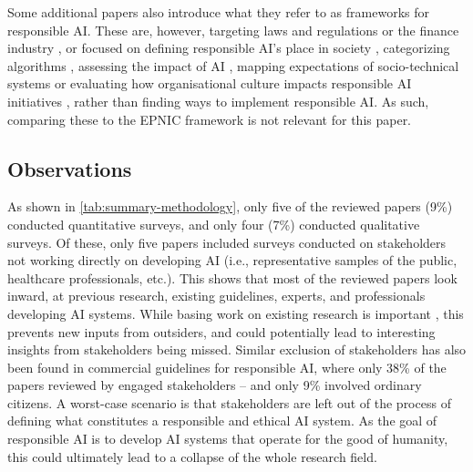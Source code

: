 Some additional papers also introduce what they refer to as frameworks for responsible AI. These are, however, targeting laws and regulations \parencite{Brand_2022} or the finance industry \parencite{Rizinski_2022}, or focused on defining responsible AI's place in society \parencite{Buhmann_2021}, categorizing algorithms \parencite{Cheng_2021}, assessing the impact of AI \parencite{Havrda_2020}, mapping expectations of socio-technical systems \parencite{Minkkinen_2021} or evaluating how organisational culture impacts responsible AI initiatives \parencite{Rakova_2021}, rather than finding ways to implement responsible AI. As such, comparing these to the EPNIC framework is not relevant for this paper.


\subsection{Observations}
As shown in \autoref{tab:summary-methodology}, only five of the reviewed papers (9\%) conducted quantitative surveys, and only four (7\%) conducted qualitative surveys. Of these, only five papers included surveys conducted on stakeholders not working directly on developing AI (i.e., representative samples of the public, healthcare professionals, etc.). This shows that most of the reviewed papers look inward, at previous research, existing guidelines, experts, and professionals developing AI systems. While basing work on existing research is important \parencite{Tranfield_2003}, this prevents new inputs from outsiders, and could potentially lead to interesting insights from stakeholders being missed. Similar exclusion of stakeholders has also been found in commercial guidelines for responsible AI, where only 38\% of the papers reviewed by \textcite{Bélisle-Pipon_2022} engaged stakeholders -- and only 9\% involved ordinary citizens. A worst-case scenario is that stakeholders are left out of the process of defining what constitutes a responsible and ethical AI system. As the goal of responsible AI is to develop AI systems that operate for the good of humanity, this could ultimately lead to a collapse of the whole research field.




